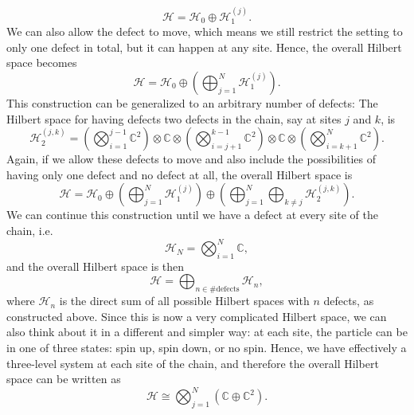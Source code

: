 	\begin{equation}
		\mathcal{H}=\mathcal{H}_0\oplus\mathcal{H}_1^{(j)}.
	\end{equation}
We can also allow the defect to move, which means we still restrict the setting to only one defect in total, but it can happen at any site. Hence, the overall Hilbert space becomes
	\begin{equation}
		\mathcal{H}=\mathcal{H}_0\oplus\left(\bigoplus_{j=1}^N\mathcal{H}_1^{(j)}\right).
	\end{equation}
This construction can be generalized to an arbitrary number of defects: The Hilbert space for having defects two defects in the chain, say at sites $j$ and $k$, is 
	\begin{equation}
		\mathcal{H}_2^{(j,k)}=\left(\bigotimes_{i=1}^{j-1}\mathbb{C}^2\right)\otimes\mathbb{C}\otimes\left(\bigotimes_{i=j+1}^{k-1}\mathbb{C}^2\right)\otimes\mathbb{C}\otimes\left(\bigotimes_{i=k+1}^{N}\mathbb{C}^2\right).
	\end{equation}
Again, if we allow these defects to move and also include the possibilities of having only one defect and no defect at all, the overall Hilbert space is
	\begin{equation}
		\mathcal{H}=\mathcal{H}_0\oplus\left(\bigoplus_{j=1}^N\mathcal{H}_1^{(j)}\right)\oplus\left(\bigoplus_{j=1}^N\bigoplus_{k\neq j}\mathcal{H}_2^{(j,k)}\right).
	\end{equation}
We can continue this construction until we have a defect at every site of the chain, i.e.
	\begin{equation}
		\mathcal{H}_N=\bigotimes_{i=1}^N\mathbb{C},
	\end{equation}
and the overall Hilbert space is then
	\begin{equation}
		\mathcal{H}=\bigoplus_{n\in\#\mathrm{defects}}\mathcal{H}_n,
	\end{equation}
where $\mathcal{H}_n$ is the direct sum of all possible Hilbert spaces with $n$ defects, as constructed above. Since this is now a very complicated Hilbert space, we can also think about it in a different and simpler way: at each site, the particle can be in one of three states: spin up, spin down, or no spin. Hence, we have effectively a three-level system at each site of the chain, and therefore the overall Hilbert space can be written as
	\begin{equation}
		\mathcal{H}\cong\bigotimes_{j=1}^N\left(\mathbb{C}\oplus\mathbb{C}^2\right).
	\end{equation}

